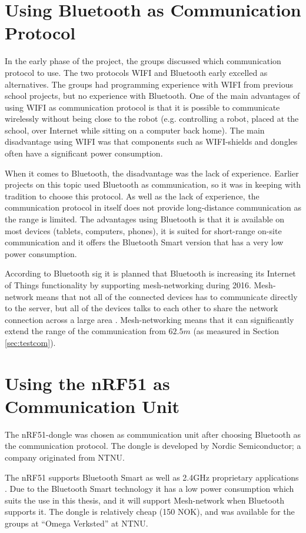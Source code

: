 \section{Using Bluetooth as Communication Protocol}
In the early phase of the project, the groups discussed which communication protocol to use. The two protocols WIFI and Bluetooth early excelled as alternatives. The groups had programming experience with WIFI from previous school projects, but no experience with Bluetooth. One of the main advantages of using WIFI as communication protocol is that it is possible to communicate wirelessly without being close to the robot (e.g. controlling a robot, placed at the school, over Internet while sitting on a computer back home). The main disadvantage using WIFI was that components such as WIFI-shields and dongles often have a significant power consumption.

When it comes to Bluetooth, the disadvantage was the lack of experience. Earlier projects on this topic used Bluetooth as communication, so it was in keeping with tradition to choose this protocol. As well as the lack of experience, the communication protocol in itself does not provide long-distance communication as the range is limited.  The advantages using Bluetooth is that it is available on most devices (tablets, computers, phones), it is suited for short-range on-site communication and it offers the Bluetooth Smart version that has a very low power consumption.

According to Bluetooth \acrshort{sig} \cite{mesh} it is planned that Bluetooth is increasing its Internet of Things functionality by supporting mesh-networking during 2016. Mesh-network means that not all of the connected devices has to communicate directly to the server, but all of the devices talks to each other to share the network connection across a large area \cite{howmesh}. Mesh-networking means that it can significantly extend the range of the communication from $62.5m$ (as measured in Section \ref{sec:testcom}).

\section{Using the nRF51 as Communication Unit}
\label{sec:nrf51asCom}
The nRF51-dongle was chosen as communication unit after choosing Bluetooth as the communication protocol. The dongle is developed by Nordic Semiconductor; a  company originated from NTNU.

The nRF51 supports Bluetooth Smart as well as 2.4GHz proprietary applications \cite{nrf51Dongle}. Due to the Bluetooth Smart technology it has a low power consumption which suits the use in this thesis, and it will support Mesh-network when Bluetooth supports it. The dongle is relatively cheap (150 NOK), and was available for the groups at ``Omega Verksted'' at NTNU.

